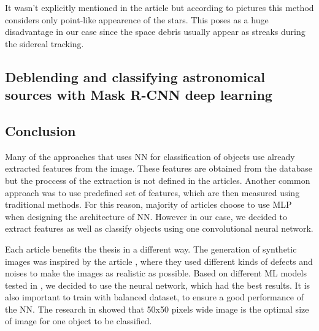 It wasn't explicitly mentioned in the article but according to pictures this method considers only point-like appearence of the stars. This poses as a huge disadvantage in our case since the space debris usually appear as streaks during the sidereal tracking.  


\subsection{Deblending and classifying astronomical sources with Mask R-CNN deep learning}





\subsection{Conclusion}

Many of the approaches that uses NN for classification of objects use already extracted features from the image. These features are obtained from the database but the proccess of the extraction is not defined in the articles. Another common approach was to use predefined set of features, which are then measured using traditional methods. For this reason, majority of articles choose to use MLP when designing the architecture of NN. However in our case, we decided to extract features as well as classify objects using one convolutional neural network. 

Each article benefits the thesis in a different way. The generation of synthetic images was inspired by the article \cite{SPILLER2020478}, where they used different kinds of defects and noises to make the images as realistic as possible.  
Based on different ML models tested in \cite{REZA2021100492}, we decided to use the neural network, which had the best results. It is also important to train with balanced dataset, to ensure a good performance of the NN. 
The research in \cite{Andreon2000} showed that 50x50 pixels wide image is the optimal size of image for one object to be classified. %


